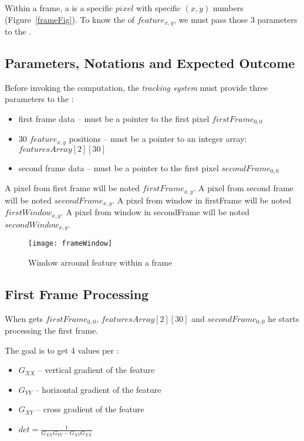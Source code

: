 Within a frame, a  is a specific $pixel$ with specific $(x,y)$ numbers (Figure~\ref{frameFig}). To know the  of $feature_{x,y}$, we must pass those 3 parameters to the .


\subsection{Parameters, Notations and Expected Outcome}

Before invoking the  computation, the \emph{tracking system} must provide three parameters to the \vc:

\begin{itemize}
	\item first frame data -- must be a pointer to the first pixel $firstFrame_{0,0}$
	\item 30 $feature_{x,y}$ positions -- must be a pointer to an integer array:  $featuresArray[2][30]$
	\item second frame data -- must be a pointer to the first pixel $secondFrame_{0,0}$
\end{itemize}

A pixel from first frame will be noted $firstFrame_{x,y}$. A pixel from second frame will be noted $secondFrame_{x,y}$. A pixel from window in firstFrame will be noted $firstWindow_{x,y}$. A pixel from window in secondFrame will be noted $secondWindow_{x,y}$.


\begin{figure}[!htbp]
	\centering
	\texttt{[image: frameWindow]}
	\caption{Window arround feature within a frame}
	\label{frameWindowFig}
\end{figure}
\FloatBarrier


\subsection{First Frame Processing}

When \vc{} gets $firstFrame_{0,0}$,  $featuresArray[2][30]$ and $secondFrame_{0,0}$ he starts processing the first frame.

The goal is to get 4 values per :
\begin{itemize}
	\item $G_{XX}$ -- vertical gradient of the feature
	\item $G_{YY}$ -- horizontal gradient of the feature
	\item $G_{XY}$ -- cross gradient of the feature
	\item $det = \frac{1}{G_{XX}G_{YY}-G_{XY}G_{XX}}$
\end{itemize}

